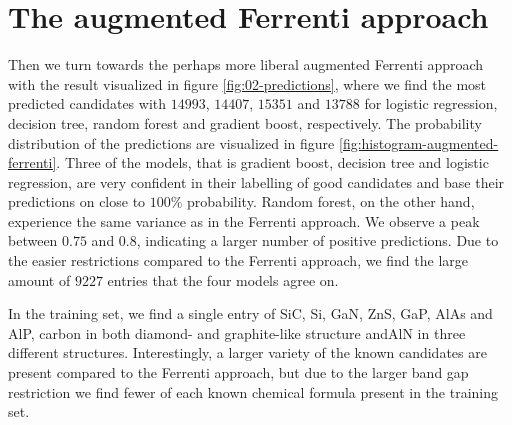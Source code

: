 \begin{comment}
\begin{table}[!ht]
\centering
\caption{Table of the number of predictions made with the optimal model for the insightful approach. }
\label{tab:timing-extraction}
\noindent\makebox[\textwidth]{
\begin{tabular}{M{3.0cm} M{4.0cm} M{4.0cm}}
  \hline
  \hline
   Model & Optimal number PC & Number of predictions \\
  \hline
  Logistic regression & $145$  & $454$ \\
  Decision trees      &  $3$   & $442$ \\
  Random forest       &  $10 $ & $325$ \\
  Gradient boost      &  $7$   & $699$ \\
  \hline
  \hline
\end{tabular}
}
\end{table}
\end{comment}


\section{The augmented Ferrenti approach}
Then we turn towards the perhaps more liberal augmented Ferrenti approach with the result visualized in figure \ref{fig:02-predictions}, where we find the most predicted candidates with $14993$, $14407$, $15351$ and $13788$ for logistic regression, decision tree, random forest and gradient boost, respectively. The probability distribution of the predictions are visualized in figure \ref{fig:histogram-augmented-ferrenti}. Three of the models, that is gradient boost, decision tree and logistic regression, are very confident in their labelling of good candidates and base their predictions on close to $100\%$ probability. Random forest, on the other hand, experience the same variance as in the Ferrenti approach. We observe a peak between $0.75$ and $0.8$, indicating a larger number of positive predictions. Due to the easier restrictions compared to the Ferrenti approach, we find the large amount of $9227$ entries that the four models agree on.



In the training set, we find a single entry of SiC, Si, GaN, ZnS, GaP, AlAs and AlP, carbon in both diamond- and graphite-like structure andAlN in three different structures. Interestingly, a larger variety of the known candidates are present compared to the Ferrenti approach, but due to the larger band gap restriction we find fewer of each known chemical formula present in the training set.

